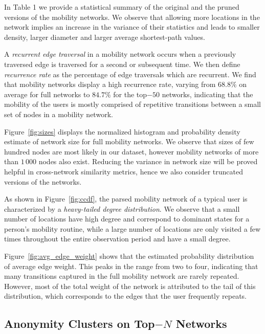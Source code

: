 In Table 1 we provide a statistical summary of the original and the pruned versions of the mobility networks.
We observe that allowing more locations in the network implies an increase in the variance of their statistics and leads to smaller density, larger diameter and larger average shortest-path values.

A \emph{recurrent edge traversal} in a mobility network occurs when a previously traversed edge is traversed for a second or subsequent time.
We then define \emph{recurrence rate} as the percentage of edge traversals which are recurrent.
We find that mobility networks display a high recurrence rate, varying from  $68.8\%$ on average for full networks to $84.7\% $ for the top$-50$ networks, indicating that the mobility of the users is mostly comprised of repetitive transitions between a small set of nodes in a mobility network.

Figure~\ref{fig:sizes} displays the normalized histogram and probability density estimate of network size for full mobility networks.
We observe that sizes of few hundred nodes are most likely in our dataset, however mobility networks of more than $1\,000$ nodes also exist.
Reducing the variance in network size will be proved helpful in cross-network similarity metrics, hence we also consider truncated versions of the networks.

As shown in Figure~\ref{fig:ccdf}, the parsed mobility network of a typical user is characterized by a \emph{heavy-tailed degree distribution}. We observe that a small number of locations have high degree and correspond to dominant states for a person's mobility routine, while a large number of locations are only visited a few times throughout the entire observation period and have a small degree.

 Figure~\ref{fig:avg_edge_weight} shows that the estimated probability distribution of average edge weight.
 This peaks in the range from two to four, indicating that many transitions captured in the full mobility network are rarely repeated. However, most of the total weight of the network is attributed to the tail of this distribution, which corresponds to the edges that the user frequently repeats.

\subsection{Anonymity Clusters on Top$-N$  Networks}

